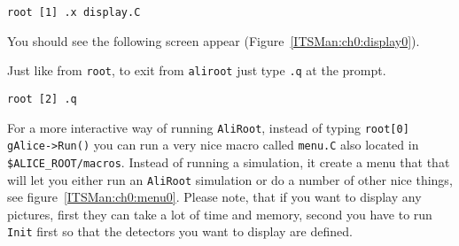 \scriptsize
\begin{verbatim}
root [1] .x display.C
\end{verbatim}
\normalsize

You should see the following screen appear (Figure~\ref{ITSMan:ch0:display0}).

\begin{figure*}[htbp]
  \begin{center}
    \leavevmode
    \caption{Typical ALICE hit display output. Note that the geometry being
    displayed is a simplified geometry, not that used by the AliRoot
    simulation.}
    \label{ITSMan:ch0:display0}
  \end{center}
\end{figure*}

Just like from \texttt{root}, to exit from \texttt{aliroot} just type
\texttt{.q} at the prompt.

\scriptsize
\begin{verbatim}
root [2] .q
\end{verbatim}
\normalsize

For a more interactive way of running \texttt{AliRoot}, instead of typing
\texttt{root[0] gAlice->Run()} you can run a very nice macro called
\texttt{menu.C} also located in \texttt{\$ALICE\_ROOT/macros}. Instead of
running a simulation, it create a menu that that will let you either run an
\texttt{AliRoot} simulation or do a number of other nice things, see
figure~\ref{ITSMan:ch0:menu0}. Please note, that if you want to display any
pictures, first they can take a lot of time and memory, second you have to run
\texttt{Init} first so that the detectors you want to display are defined.

\begin{figure*}[htbp]
  \begin{center}
    \leavevmode
    \caption{This shows a number of ``Automated'' commands that can be
    performed. Simply by clicking on one of these buttons the action will take
    place. The ``Trees'' refers to the tree of geometric objects that make up
    the defined AliRoot geometry as defined in \texttt{Config.C}. The
    ``Pictures'' refer to pictures of the Alice geometry as defined in
    \texttt{Config.C}. Since these are the detailed pictures they may require a
    lot of time and memory to execute. ``Hide'', ``Shading'', and ``Box Clip''
    refer to how the pictures will be displayed. ``Run Lego'' will produce a
    radiation map of different parts of the defined Alice detector by creating
    and transporting Geantinos~\cite{GeantMan:Geantino}, a non-interacting
    particle used only to measure radiation length between points along it's
    straight line path.}
    \label{ITSMan:ch0:menu0}
  \end{center}
\end{figure*}

